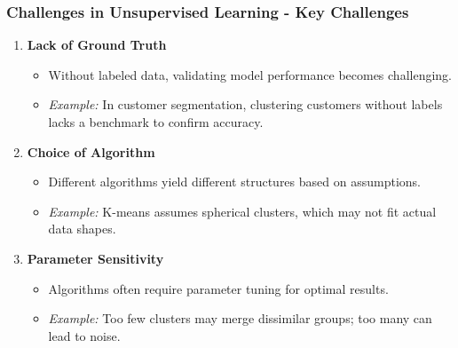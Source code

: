 \documentclass[aspectratio=169]{beamer}
\begin{document}
\begin{frame}[fragile]
    \frametitle{Challenges in Unsupervised Learning - Key Challenges}
    \begin{enumerate}
        \item \textbf{Lack of Ground Truth}
            \begin{itemize}
                \item Without labeled data, validating model performance becomes challenging.
                \item \textit{Example:} In customer segmentation, clustering customers without labels lacks a benchmark to confirm accuracy.
            \end{itemize}
            
        \item \textbf{Choice of Algorithm}
            \begin{itemize}
                \item Different algorithms yield different structures based on assumptions.
                \item \textit{Example:} K-means assumes spherical clusters, which may not fit actual data shapes.
            \end{itemize}
            
        \item \textbf{Parameter Sensitivity}
            \begin{itemize}
                \item Algorithms often require parameter tuning for optimal results.
                \item \textit{Example:} Too few clusters may merge dissimilar groups; too many can lead to noise.
            \end{itemize}
    \end{enumerate}
\end{frame}
\end{document}

